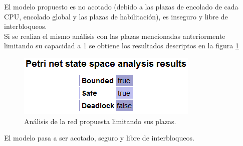 \documentclass[a4paper]{book}
\begin{document}
El modelo propuesto es no acotado (debido a las plazas de encolado de cada CPU, encolado global y las plazas de habilitaci\'on), es inseguro y libre de interbloqueos.\\

Si se realiza el mismo an\'alisis con las plazas mencionadas anteriormente limitando su capacidad a 1 se obtiene los resultados descriptos en la figura \ref{Fig:validacion13.2}

\begin{figure} [H]
	\begin{center}
        \includegraphics[scale=0.7]{./imagenes/it13validacion2.png}
		\caption{An\'alisis de la red propuesta limitando sus plazas.}
		\label{Fig:validacion13.2}
	\end{center}
\end{figure}

El modelo pasa a ser acotado, seguro y libre de interbloqueos.\\
\end{document}
